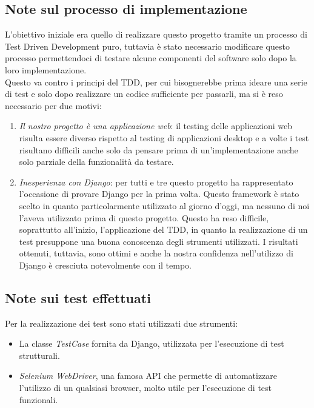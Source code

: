 \documentclass[10pt,a4paper]{article}
\begin{document}
	\subsection{Note sul processo di implementazione}
	L'obiettivo iniziale era quello di realizzare questo progetto tramite un processo di Test Driven Development puro, tuttavia è stato necessario modificare questo processo permettendoci di testare alcune componenti del software solo dopo la loro implementazione. \\
	Questo va contro i principi del TDD, per cui bisognerebbe prima ideare una serie di test e solo dopo realizzare un codice sufficiente per passarli, ma si è reso necessario per due motivi:
	\begin{enumerate}
		\item \textit{Il nostro progetto è una applicazione web}: il testing delle applicazioni web risulta essere diverso rispetto al testing di applicazioni desktop e a volte i test risultano difficili anche solo da pensare prima di un'implementazione anche solo parziale della funzionalità da testare.
		\item \textit{Inesperienza con Django}: per tutti e tre questo progetto ha rappresentato l'occasione di provare Django per la prima volta. Questo framework è stato scelto in quanto particolarmente utilizzato al giorno d'oggi, ma nessuno di noi l'aveva utilizzato prima di questo progetto. Questo ha reso difficile, soprattutto all'inizio, l'applicazione del TDD, in quanto la realizzazione di un test presuppone una buona conoscenza degli strumenti utilizzati. I risultati ottenuti, tuttavia, sono ottimi e anche la nostra confidenza nell'utilizzo di Django è cresciuta notevolmente con il tempo.
	\end{enumerate}

	\subsection{Note sui test effettuati}
	Per la realizzazione dei test sono stati utilizzati due strumenti:
	\begin{itemize}
		\item La classe \textit{TestCase} fornita da Django, utilizzata per l'esecuzione di test strutturali.
		\item \textit{Selenium WebDriver}, una famosa API che permette di automatizzare l'utilizzo di un qualsiasi browser, molto utile per l'esecuzione di test funzionali.
	\end{itemize}
\end{document}
